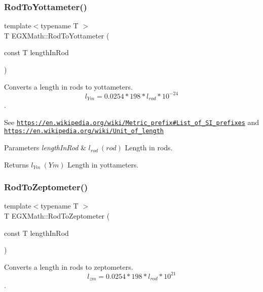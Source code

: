 \subsubsection{\texorpdfstring{Rod\+To\+Yottameter()}{RodToYottameter()}}
{\footnotesize\ttfamily template$<$typename T $>$ \\
T E\+G\+X\+Math\+::\+Rod\+To\+Yottameter (\begin{DoxyParamCaption}\item[{const T}]{length\+In\+Rod }\end{DoxyParamCaption})}



Converts a length in rods to yottameters. \[ l_{Ym}=0.0254 * 198 * l_{rod} * 10^{-24} \]. 

See \href{https://en.wikipedia.org/wiki/Metric_prefix#List_of_SI_prefixes}{\tt https\+://en.\+wikipedia.\+org/wiki/\+Metric\+\_\+prefix\#\+List\+\_\+of\+\_\+\+S\+I\+\_\+prefixes} and \href{https://en.wikipedia.org/wiki/Unit_of_length}{\tt https\+://en.\+wikipedia.\+org/wiki/\+Unit\+\_\+of\+\_\+length} 
\begin{DoxyParams}{Parameters}
{\em length\+In\+Rod} & $ l_{rod}\ (rod)$ Length in rods. \\
\hline
\end{DoxyParams}
\begin{DoxyReturn}{Returns}
$ l_{Ym}\ (Ym)$ Length in yottameters. 
\end{DoxyReturn}
\mbox{\label{group___e_g_x_math-_conversions-_length_conversions-_imperial-_rod-_s_i_gae5ab77b04e6ee5bfdce5aaa3917b92a5}} 
\subsubsection{\texorpdfstring{Rod\+To\+Zeptometer()}{RodToZeptometer()}}
{\footnotesize\ttfamily template$<$typename T $>$ \\
T E\+G\+X\+Math\+::\+Rod\+To\+Zeptometer (\begin{DoxyParamCaption}\item[{const T}]{length\+In\+Rod }\end{DoxyParamCaption})}



Converts a length in rods to zeptometers. \[ l_{zm}=0.0254 * 198 * l_{rod} * 10^{21} \]. 

